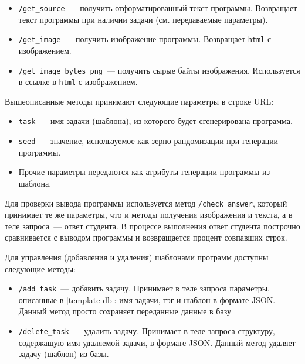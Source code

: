 \begin{itemize}
    \item \texttt{/get\_source}~--- получить отформатированный текст программы.
          Возвращает текст программы при наличии задачи (см. передаваемые параметры).
    \item \texttt{/get\_image}~--- получить изображение программы. Возвращает \texttt{html} с изображением.
    \item \texttt{/get\_image\_bytes\_png}~--- получить сырые байты изображения. Используется в ссылке
          в \texttt{html} с изображением.
\end{itemize}

Вышеописанные методы принимают следующие параметры в строке URL:
\begin{itemize}
    \item \texttt{task}~--- имя задачи (шаблона), из которого будет сгенерирована программа.
    \item \texttt{seed}~--- значение, используемое как зерно рандомизации при генерации программы.
    \item Прочие параметры передаются как атрибуты генерации программы из шаблона.
\end{itemize}

Для проверки вывода программы используется метод \texttt{/check\_answer}, который принимает те же
параметры, что и методы получения изображения и текста, а в теле запроса~--- ответ студента.
В процессе выполнения ответ студента построчно сравнивается с выводом программы и возвращается процент
совпавших строк.

Для управления (добавления и удаления) шаблонами программ доступны следующие методы:
\begin{itemize}
    \item \texttt{/add\_task}~--- добавить задачу. Принимает в теле запроса параметры, описанные в
          \ref{template-db}: имя задачи, тэг и шаблон в формате JSON. Данный метод просто сохраняет
          переданные данные в базу
    \item \texttt{/delete\_task}~--- удалить задачу. Принимает в теле запроса структуру, содержащую
          имя удаляемой задачи, в формате JSON. Данный метод удаляет задачу (шаблон) из базы.

\end{itemize}
